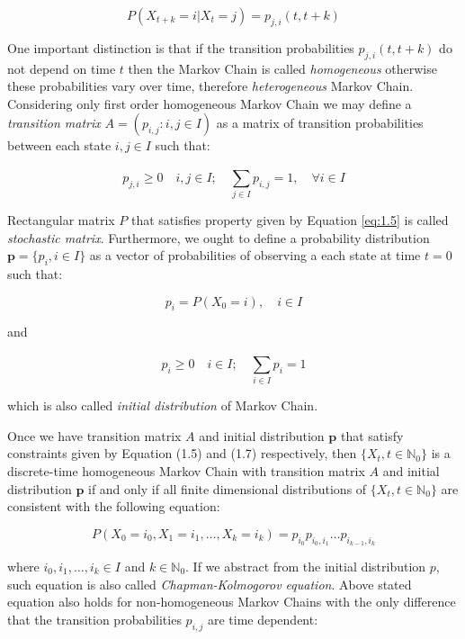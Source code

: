 \begin{equation}
P(X_{t+k}=i|X_t=j) = p_{j,i}(t,t+k)
\end{equation}

One important distinction is that if the transition probabilities $p_{j,i}(t,t+k)$ do not depend on time $t$ then the Markov Chain is called {\it homogeneous} otherwise these probabilities vary over time, therefore {\it heterogeneous} Markov Chain.
Considering only first order homogeneous Markov Chain we may define a {\it transition matrix} 
$A = (p_{i,j} : i,j \in I)$ as a matrix of transition probabilities between each state $i,j \in I$ such that:

\begin{equation} \label{eq:1.5}
p_{j,i} \geq 0 \quad i,j \in I; \quad \sum_{j \in I} ^{}p_{i,j} = 1, \quad \forall i \in I
\end{equation}

Rectangular matrix $P$ that satisfies property given by Equation \ref{eq:1.5} is called {\it stochastic matrix}. 
Furthermore, we ought to define a probability distribution $\textbf{p} =\{p_i, i \in I\} $ as a vector of probabilities of observing a each state at time $t=0$ such that:

\begin{equation}
p_i = P(X_0=i), \quad i \in I
\end{equation}

and 

\begin{equation}
p_i \geq 0 \quad i \in I; \quad \sum_{i \in I} ^{}p_i = 1
\end{equation}

which is also called {\it initial distribution} of Markov Chain. 

Once we have transition matrix $A$ and initial distribution $\textbf{p}$ that satisfy constraints given by Equation (1.5) and (1.7) respectively,
then $\{X_t,t \in \mathbb{N}_0\}$ is a discrete-time homogeneous Markov Chain with transition matrix $A$ and initial distribution $\textbf{p}$ 
if and only if all finite dimensional distributions of $\{X_t,t \in \mathbb{N}_0\}$ are consistent with the following equation:

\begin{equation}
P(X_{0}=i_0,X_{1}=i_1,\ldots,X_{k}=i_k) = p_{i_0} p_{i_0,i_1} \ldots p_{i_{k-1},i_k}
\end{equation}

where $i_0,i_1,\ldots,i_k \in I$ and $k \in \mathbb{N}_0$. If we abstract from the initial distribution $p$, such equation is also called {\it Chapman-Kolmogorov equation}.
Above stated equation also holds for non-homogeneous Markov Chains with the only difference that the transition probabilities $p_{i,j}$ are time dependent:

